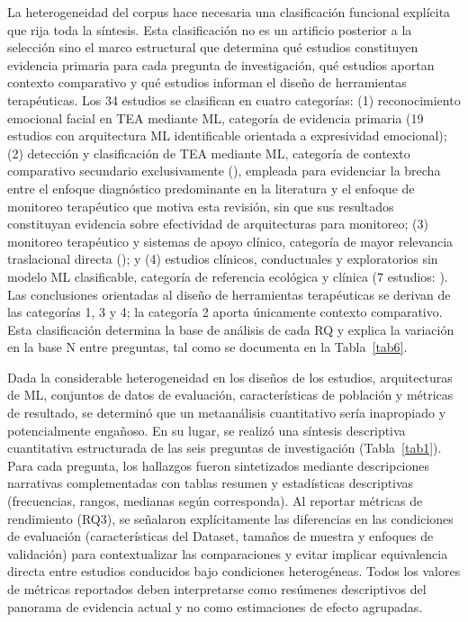 \documentclass[3p,twocolumn,times]{elsarticle}
\begin{document}
	La heterogeneidad del corpus hace necesaria una clasificación funcional explícita
	que rija toda la síntesis. Esta clasificación no es un artificio posterior a la
	selección sino el marco estructural que determina qué estudios constituyen evidencia primaria para cada pregunta de investigación, qué estudios aportan contexto
	comparativo y qué estudios informan el diseño de herramientas terapéuticas. Los
	34 estudios se clasifican en cuatro categorías: (1) reconocimiento emocional facial
	en TEA mediante ML, categoría de evidencia primaria (19 estudios con arquitectura
	ML identificable orientada a expresividad emocional); (2) detección y clasificación
	de TEA mediante ML, categoría de contexto comparativo secundario exclusivamente
	(\cite{Ahmad2024,Alsubai2025}), empleada para evidenciar la brecha entre el enfoque
	diagnóstico predominante en la literatura y el enfoque de monitoreo terapéutico que
	motiva esta revisión, sin que sus resultados constituyan evidencia sobre efectividad
	de arquitecturas para monitoreo; (3) monitoreo terapéutico y sistemas de apoyo
	clínico, categoría de mayor relevancia traslacional directa
	(\cite{Hassan2025,Rudovic2018,Rudovic2019}); y (4) estudios clínicos, conductuales
	y exploratorios sin modelo ML clasificable, categoría de referencia ecológica y
	clínica (7 estudios:
	\cite{He2019,Reed2021,Lecciso2021,Almeida2019,Nagae2022,Papaioannou2021,Xu2023}).
	Las conclusiones orientadas al diseño de herramientas terapéuticas se derivan de
	las categorías 1, 3 y 4; la categoría 2 aporta únicamente contexto comparativo.
	Esta clasificación determina la base de análisis de cada RQ y explica la variación
	en la base N entre preguntas, tal como se documenta en la Tabla~\ref{tab6}.
	
	Dada la considerable heterogeneidad en los diseños de los estudios, arquitecturas
	de ML, conjuntos de datos de evaluación, características de población y métricas
	de resultado, se determinó que un metaanálisis cuantitativo sería inapropiado y
	potencialmente engañoso. En su lugar, se realizó una síntesis descriptiva
	cuantitativa estructurada de las seis preguntas de investigación
	(Tabla~\ref{tab1}). Para cada pregunta, los hallazgos fueron sintetizados mediante
	descripciones narrativas complementadas con tablas resumen y estadísticas
	descriptivas (frecuencias, rangos, medianas según corresponda). Al reportar métricas de rendimiento (RQ3), se señalaron explícitamente las diferencias en las
	condiciones de evaluación (características del Dataset, tamaños de muestra y
	enfoques de validación) para contextualizar las comparaciones y evitar implicar
	equivalencia directa entre estudios conducidos bajo condiciones heterogéneas.
	Todos los valores de métricas reportados deben interpretarse como resúmenes
	descriptivos del panorama de evidencia actual y no como estimaciones de efecto
	agrupadas.
	
\end{document}
